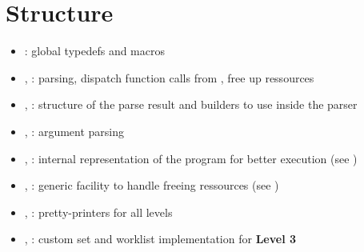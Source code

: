 \section{Structure}

\begin{itemize}
    \item {}:
        global typedefs and macros
    \item {}, :
        parsing, dispatch function calls from , free up ressources
    \item {}, :
        structure of the parse result and builders to use inside the parser
    \item {}, :
        argument parsing
    \item {}, :
        internal representation of the program for better execution (see )
    \item {}, :
        generic facility to handle freeing ressources (see )
    \item {}, :
        pretty-printers for all levels
    \item {}, :
        custom set and worklist implementation for \textbf{Level 3}
\end{itemize}
